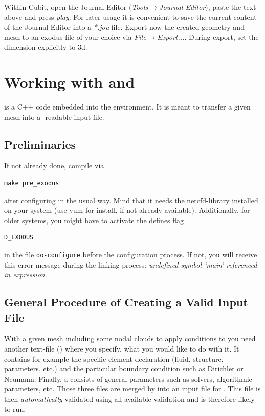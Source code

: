 Within Cubit, open the Journal-Editor (\emph{Tools}$\to$\emph{Journal
Editor}), paste the text above and press \emph{play}. For later usage it is convenient
to save the current content of the Journal-Editor into a \emph{*.jou} file. 
Export now the created geometry and mesh to an
exodus-file of your choice via \emph{File}$\to$\emph{Export...}. 
During export, set the dimension explicitly to 3d.

\section{Working with \prexo and \baci{}}

\prexo is a C++ code embedded into the \baci{} environment. It is meant to
transfer a given mesh into a \baci{}-readable input file.

\subsection{Preliminaries}

If not already done, compile \prexo via \begin{verbatim}make pre_exodus\end{verbatim} after 
configuring \baci{} in the usual way. Mind that it needs the netcfd-library 
installed on your system (use yum for install, if not already available). 
Additionally, for older systems, you might have to activate the defines flag
\begin{verbatim}D_EXODUS\end{verbatim}
in the file \verb|do-configure| before the configuration process. If not, you will receive this error
message during the linking process: \emph{undefined symbol `main' referenced in expression}. 

\subsection{General Procedure of Creating a Valid \baci{} Input File}
With a given mesh including some nodal clouds to apply conditions to you need
another text-file (\bc) where you specify, what you would like to do with
it. It contains for example the specific element declaration (fluid, structure,
parameters, etc.) and the particular boundary condition such as Dirichlet or
Neumann. Finally, a \head consists of general parameters such as
solvers, algorithmic parameters, etc. Those three files are merged by \prexo
into an input file for \baci{}. This file is then \emph{automatically} validated
using all available \baci{} validation and is therefore likely to run.

